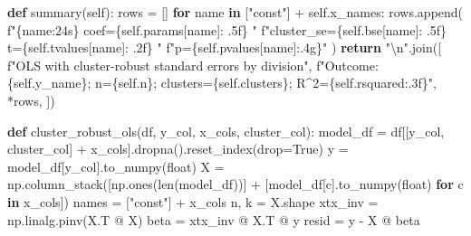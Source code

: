 \documentclass[
  letterpaper,
  DIV=11,
  numbers=noendperiod]{scrartcl}
\newenvironment{Shaded}{\begin{snugshade}}{\end{snugshade}}
\newcommand{\BuiltInTok}[1]{\textcolor[rgb]{0.00,0.23,0.31}{#1}}
\newcommand{\CharTok}[1]{\textcolor[rgb]{0.13,0.47,0.30}{#1}}
\newcommand{\ControlFlowTok}[1]{\textcolor[rgb]{0.00,0.23,0.31}{\textbf{#1}}}
\newcommand{\KeywordTok}[1]{\textcolor[rgb]{0.00,0.23,0.31}{\textbf{#1}}}
\newcommand{\NormalTok}[1]{\textcolor[rgb]{0.00,0.23,0.31}{#1}}
\newcommand{\OperatorTok}[1]{\textcolor[rgb]{0.37,0.37,0.37}{#1}}
\newcommand{\SpecialCharTok}[1]{\textcolor[rgb]{0.37,0.37,0.37}{#1}}
\newcommand{\SpecialStringTok}[1]{\textcolor[rgb]{0.13,0.47,0.30}{#1}}
\newcommand{\StringTok}[1]{\textcolor[rgb]{0.13,0.47,0.30}{#1}}
\newcommand{\VariableTok}[1]{\textcolor[rgb]{0.07,0.07,0.07}{#1}}
\begin{document}
\begin{Shaded}
\begin{Highlighting}[]
    \KeywordTok{def}\NormalTok{ summary(}\VariableTok{self}\NormalTok{):}
\NormalTok{        rows }\OperatorTok{=}\NormalTok{ []}
        \ControlFlowTok{for}\NormalTok{ name }\KeywordTok{in}\NormalTok{ [}\StringTok{"const"}\NormalTok{] }\OperatorTok{+} \VariableTok{self}\NormalTok{.x\_names:}
\NormalTok{            rows.append(}
                \SpecialStringTok{f"}\SpecialCharTok{\{}\NormalTok{name}\SpecialCharTok{:24s\}}\SpecialStringTok{ coef=}\SpecialCharTok{\{}\VariableTok{self}\SpecialCharTok{.}\NormalTok{params[name]}\SpecialCharTok{: .5f\}}\SpecialStringTok{  "}
                \SpecialStringTok{f"cluster\_se=}\SpecialCharTok{\{}\VariableTok{self}\SpecialCharTok{.}\NormalTok{bse[name]}\SpecialCharTok{: .5f\}}\SpecialStringTok{  t=}\SpecialCharTok{\{}\VariableTok{self}\SpecialCharTok{.}\NormalTok{tvalues[name]}\SpecialCharTok{: .2f\}}\SpecialStringTok{  "}
                \SpecialStringTok{f"p=}\SpecialCharTok{\{}\VariableTok{self}\SpecialCharTok{.}\NormalTok{pvalues[name]}\SpecialCharTok{:.4g\}}\SpecialStringTok{"}
\NormalTok{            )}
        \ControlFlowTok{return} \StringTok{"}\CharTok{\textbackslash{}n}\StringTok{"}\NormalTok{.join([}
            \SpecialStringTok{f"OLS with cluster{-}robust standard errors by division"}\NormalTok{,}
            \SpecialStringTok{f"Outcome: }\SpecialCharTok{\{}\VariableTok{self}\SpecialCharTok{.}\NormalTok{y\_name}\SpecialCharTok{\}}\SpecialStringTok{; n=}\SpecialCharTok{\{}\VariableTok{self}\SpecialCharTok{.}\NormalTok{n}\SpecialCharTok{\}}\SpecialStringTok{; clusters=}\SpecialCharTok{\{}\VariableTok{self}\SpecialCharTok{.}\NormalTok{clusters}\SpecialCharTok{\}}\SpecialStringTok{; R\^{}2=}\SpecialCharTok{\{}\VariableTok{self}\SpecialCharTok{.}\NormalTok{rsquared}\SpecialCharTok{:.3f\}}\SpecialStringTok{"}\NormalTok{,}
            \OperatorTok{*}\NormalTok{rows,}
\NormalTok{        ])}

\KeywordTok{def}\NormalTok{ cluster\_robust\_ols(df, y\_col, x\_cols, cluster\_col):}
\NormalTok{    model\_df }\OperatorTok{=}\NormalTok{ df[[y\_col, cluster\_col] }\OperatorTok{+}\NormalTok{ x\_cols].dropna().reset\_index(drop}\OperatorTok{=}\VariableTok{True}\NormalTok{)}
\NormalTok{    y }\OperatorTok{=}\NormalTok{ model\_df[y\_col].to\_numpy(}\BuiltInTok{float}\NormalTok{)}
\NormalTok{    X }\OperatorTok{=}\NormalTok{ np.column\_stack([np.ones(}\BuiltInTok{len}\NormalTok{(model\_df))] }\OperatorTok{+}\NormalTok{ [model\_df[c].to\_numpy(}\BuiltInTok{float}\NormalTok{) }\ControlFlowTok{for}\NormalTok{ c }\KeywordTok{in}\NormalTok{ x\_cols])}
\NormalTok{    names }\OperatorTok{=}\NormalTok{ [}\StringTok{"const"}\NormalTok{] }\OperatorTok{+}\NormalTok{ x\_cols}
\NormalTok{    n, k }\OperatorTok{=}\NormalTok{ X.shape}
\NormalTok{    xtx\_inv }\OperatorTok{=}\NormalTok{ np.linalg.pinv(X.T }\OperatorTok{@}\NormalTok{ X)}
\NormalTok{    beta }\OperatorTok{=}\NormalTok{ xtx\_inv }\OperatorTok{@}\NormalTok{ X.T }\OperatorTok{@}\NormalTok{ y}
\NormalTok{    resid }\OperatorTok{=}\NormalTok{ y }\OperatorTok{{-}}\NormalTok{ X }\OperatorTok{@}\NormalTok{ beta}


\end{Highlighting}
\end{Shaded}
\end{document}
